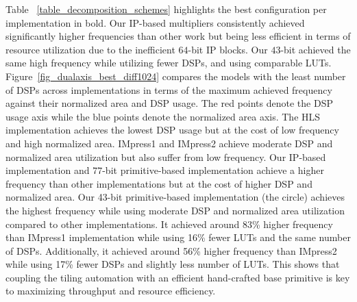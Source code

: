Table ~\ref{table_decomposition_schemes} highlights the best configuration per implementation in bold.
Our IP-based multipliers consistently achieved significantly higher frequencies than other work but being less efficient in terms of resource utilization due to the inefficient $64$-bit IP blocks. 
Our $43$-bit achieved the same high frequency while utilizing fewer DSPs, and using comparable LUTs.
Figure~\ref{fig_dualaxis_best_diff1024} compares the models with the least number of DSPs across implementations in terms of the maximum achieved frequency against their normalized area and DSP usage.
The red points denote the DSP usage axis while the blue points denote the normalized area axis. 
The HLS implementation achieves the lowest DSP usage but at the cost of low frequency and high normalized area.
IMpress1 and IMpress2 achieve moderate DSP and normalized area utilization but also suffer from low frequency.
Our IP-based implementation and  $77$-bit primitive-based implementation achieve a  higher frequency than other implementations but at the cost of higher DSP and normalized area.
Our 43-bit primitive-based implementation (the circle) achieves the highest frequency while using moderate DSP and normalized area utilization compared to other implementations.
It achieved around 83\% higher frequency than IMpress1 implementation while using 16\% fewer LUTs and the same number of DSPs.
Additionally, it achieved around 56\% higher frequency than IMpress2 while using 17\% fewer DSPs and slightly less number of LUTs. 
This shows that coupling the tiling automation with an efficient hand-crafted base primitive is key to maximizing throughput and resource efficiency.



